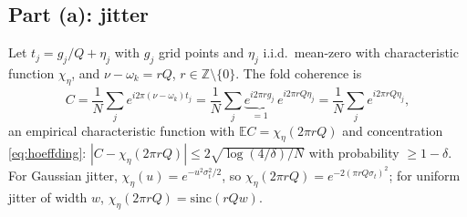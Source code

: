 \documentclass[10pt]{article}
\newcommand{\Z}{\mathbb{Z}}
\begin{document}
\subsection{Part (a): jitter}

Let $t_j=g_j/Q+\eta_j$ with $g_j$ grid points and $\eta_j$ i.i.d.\ mean-zero with
characteristic function $\chi_\eta$, and $\nu-\omega_k=rQ$, $r\in\Z\setminus\{0\}$.  The
fold coherence is
\[
C=\frac1N\sum_je^{i2\pi(\nu-\omega_k)t_j}
 =\frac1N\sum_j\underbrace{e^{i2\pi rg_j}}_{=1}\,e^{i2\pi rQ\eta_j}
 =\frac1N\sum_je^{i2\pi rQ\eta_j},
\]
an empirical characteristic function with $\mathbb E C=\chi_\eta(2\pi rQ)$ and
concentration \eqref{eq:hoeffding}: $|C-\chi_\eta(2\pi rQ)|\le
2\sqrt{\log(4/\delta)/N}$ with probability $\ge1-\delta$.  For Gaussian jitter,
$\chi_\eta(u)=e^{-u^2\sigma_t^2/2}$, so $\chi_\eta(2\pi rQ)=e^{-2(\pi rQ\sigma_t)^2}$;
for uniform jitter of width $w$, $\chi_\eta(2\pi rQ)=\mathrm{sinc}(rQw)$.
\end{document}
